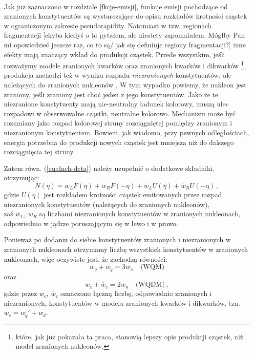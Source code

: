 \documentclass[a4paper,12pt]{article}
\begin{document}
\paragraph{}
Jak już zaznaczono w rozdziale \ref{fkcje-emisji}, funkcje emisji pochodzące od zranionych konstytuentów są wystarczające do opisu rozkładów krotności cząstek w ograniczonym zakresie pseudorapidity. Natomiast w tzw. regionach fragmentacji {\color{blue}[chyba kiedyś o to pytałem, ale niestety zapomniałem. Mógłby Pan mi opowiedzieć jeszcze raz, co to są/ jak się definiuje regiony fragmentacji?]} inne efekty mają znaczący wkład do produkcji cząstek. Przede wszystkim, jeśli rozważymy modele zranionych kwarków oraz zranionych kwarków i dikwarków \footnote{które, jak już pokazała ta praca, stanowią lepszy opis produkcji cząstek, niż model zranionych nukleonów.}, produkcja zachodzi też w wyniku rozpadu \textit{niezranionych} konstytuentów, ale należących do zranionych nukleonów \cite{Bialas:2007eg}. W tym wypadku powiemy, że nukleon jest zraniony, jeśli zraniony jest choć jeden z jego konstytuentów. Jako że te niezranione konstytuenty mają nie-neutralny ładunek kolorowy, muszą ulec rozpadowi w obserwowalne cząstki, neutralne kolorowo. Mechanizm może być rozumiany jako rozpad kolorowej struny rozciągniętej pomiędzy zranionym i niezranionym konstytuentem. Bowiem, jak wiadomo, przy pewnych odległościach, energia potrzebna do produkcji nowych cząstek jest mniejsza niż do dalszego rozciągnięcia tej struny.

Zatem równ. (\ref{eq:dnch-deta}) należy uzupełnić o dodatkowe składniki, otrzymując:
\begin{equation} \label{eq:n-with-unwounded}
N(\eta) = w_L F(\eta) + w_R F(-\eta) + \overline{w}_L U(\eta) + \overline{w}_R U(-\eta)  \,,
\end{equation}
gdzie $U(\eta)$ jest rozkładem krotności cząstek emitowanych przez rozpad niezranionych konstytuentów (należących do zranionych nukleonów),\\
zaś $\overline{w}_L$, $\overline{w}_R$ są liczbami niezranionych konstytuentów w zranionych nukleonach, odpowiednio w jądrze poruszającym się w lewo i w prawo.

Ponieważ po dodaniu do siebie konstytuentów zranionych i niezranionych w zranionych nukleonach otrzymamy liczbę wszystkich konstytuentów w zranionych nukleonach, więc oczywiste jest, że zachodzą równości:
\begin{equation}
w_q + \overline{w}_q = 3 w_n \quad \text{(WQM)}
\end{equation}
oraz
\begin{equation}
w_c + \overline{w}_c = 2 w_n \quad \text{(WQDM)}\,,
\end{equation}
gdzie przez $w_c$, $\overline{w}_c$ oznaczono łączną liczbę, odpowiednio zranionych i niezranionych, konstytuentów w modelu zranionych kwarków i dikwarków, tzn. $w_c = w_q' + w_d$. 
\end{document}
